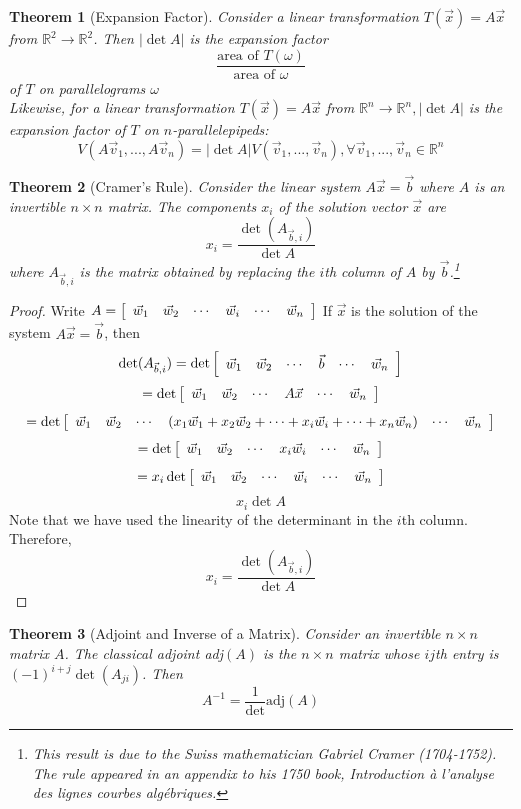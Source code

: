 \documentclass[10pt]{report}
\newtheorem{thm2}{Theorem}[section]
\begin{document}
\begin{thm2}[Expansion Factor]
Consider a linear transformation $T(\vec{x})=A\vec{x}$ from $\mathbb{R}^2\to \mathbb{R}^2$. Then $|\det A|$ is the expansion factor 
$$\frac{\text{area of }T(\omega)}{\text{area of }\omega}$$
of $T$ on parallelograms $\omega$\\
Likewise, for a linear transformation $T(\vec{x})=A\vec{x}$ from $\mathbb{R}^n\to \mathbb{R}^n, |\det A|$ is the expansion factor of $T$ on $n$-parallelepipeds:
$$V(A\vec{v}_1, ..., A\vec{v}_n)=|\det A|V(\vec{v}_1,...,\vec{v}_n), \forall \vec{v}_1,...,\vec{v}_n \in \mathbb{R}^n$$
\end{thm2}
\begin{thm2}[Cramer's Rule]
Consider the linear system $A\vec{x}=\vec{b}$ where $A$ is an invertible $n\times n$ matrix. The components $x_i$ of the solution vector $\vec{x}$ are
$$x_i=\frac{\det(A_{\vec{b},i})}{\det A}$$
where $A_{\vec{b},i}$ is the matrix obtained by replacing the $i$th column of $A$ by $\vec{b}$.\footnote{This result is due to the Swiss mathematician Gabriel Cramer (1704-1752). The rule appeared in an appendix to his 1750 book, \textit{Introduction \`{a} l'analyse des lignes courbes alg\'{e}briques}.} 
\end{thm2}
\begin{proof}
Write $A= \left[ \begin{array}{c c c c c c}
\vec{w}_1 & \vec{w}_2 & \cdots & \vec{w}_i & \cdots & \vec{w}_n
\end{array}\right]$
If $\vec{x}$ is the solution of the system $A\vec{x}= \vec{b}$, then
$$\det(A_{\vec{b},i})=\det\left[ \begin{array}{c c c c c c}
\vec{w}_1 & \vec{w}_2 & \cdots & \vec{b} & \cdots & \vec{w}_n
\end{array}\right]$$
$$=\det \left[ \begin{array}{c c c c c c}
\vec{w}_1 & \vec{w}_2 & \cdots & A\vec{x} & \cdots & \vec{w}_n
\end{array}\right]$$
$$=\det \left[ \begin{array}{c c c c c c}
\vec{w}_1 & \vec{w}_2 & \cdots & (x_1\vec{w}_1 + x_2\vec{w}_2 + \cdots + x_i\vec{w}_i + \cdots + x_n\vec{w}_n) & \cdots & \vec{w}_n
\end{array}\right]$$
$$=\det\left[ \begin{array}{c c c c c c}
\vec{w}_1 & \vec{w}_2 & \cdots & x_i\vec{w}_i & \cdots & \vec{w}_n
\end{array}\right]$$
$$=x_i\det\left[ \begin{array}{c c c c c c}
\vec{w}_1 & \vec{w}_2 & \cdots & \vec{w}_i & \cdots & \vec{w}_n
\end{array}\right]$$
$$x_i\det A$$
Note that we have used the linearity of the determinant in the $i$th column. Therefore,
$$x_i=\frac{\det(A_{\vec{b},i})}{\det A}$$
\end{proof}
\begin{thm2}[Adjoint and Inverse of a Matrix]
Consider an invertible $n\times n$ matrix $A$. The classical adjoint adj$(A)$ is the $n\times n$ matrix whose $ij$th entry is $(-1)^{i+j} \det(A_{ji})$. Then
$$A^{-1}=\frac{1}{\det}\text{adj}(A)$$
\end{thm2}
\end{document}

